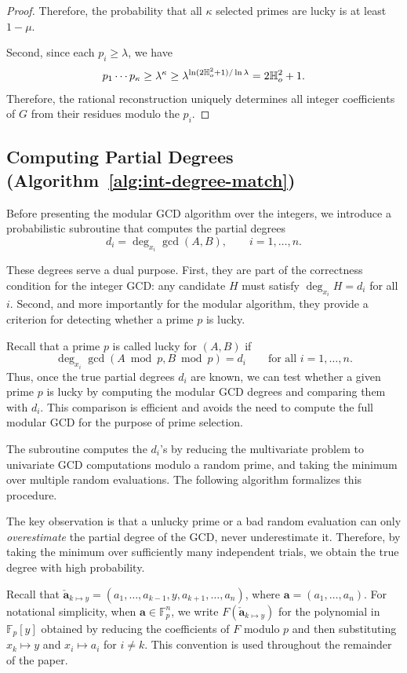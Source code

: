 \documentclass{article}
\numberwithin{equation}{section}
\begin{document}
\begin{proof}
Therefore, the probability that all $\kappa$ selected primes are lucky is at least $1 - \mu$.


Second, since each $p_i \ge \lambda$, we have
\[
p_1 \cdots p_\kappa \ge \lambda^\kappa \ge \lambda^{\ln(2\mathbb{H}_{o}^2+1)/\ln \lambda} = 2\mathbb{H}_{o}^2+1.
\]
Therefore, the rational reconstruction uniquely determines all integer coefficients of $G$ from their residues modulo the $p_i$.
\end{proof}

\subsection{Computing Partial Degrees (Algorithm~\ref{alg:int-degree-match})}
\label{sec:partial-deg}

Before presenting the modular GCD algorithm over the integers, we introduce a probabilistic subroutine that computes the partial degrees
\[
d_i = \deg_{x_i} \gcd(A,B), \qquad i = 1,\dots,n.
\]

These degrees serve a dual purpose. First, they are part of the correctness condition for the integer GCD: any candidate $H$ must satisfy $\deg_{x_i} H = d_i$ for all $i$. Second, and more importantly for the modular algorithm, they provide a criterion for detecting whether a prime $p$ is lucky.

Recall that a prime $p$ is called lucky for $(A,B)$ if
\[
\deg_{x_i} \gcd(A \bmod p, B \bmod p) = d_i \qquad \text{for all } i=1,\dots,n.
\]
Thus, once the true partial degrees $d_i$ are known, we can test whether a given prime $p$ is lucky by computing the modular GCD degrees and comparing them with $d_i$. This comparison is efficient and avoids the need to compute the full modular GCD for the purpose of prime selection.

The subroutine computes the $d_i$'s by reducing the multivariate problem to univariate GCD computations modulo a random prime, and taking the minimum over multiple random evaluations. The following algorithm formalizes this procedure.

The key observation is that  a unlucky prime or a bad random evaluation can only \emph{overestimate} the partial degree of the GCD, never underestimate it. Therefore, by taking the minimum over sufficiently many independent trials, we obtain the true degree with high probability.

Recall that $\mathbf{\check{a}}_{k \mapsto y}  = (a_1,\dots,a_{k-1}, y, a_{k+1},\dots,a_n)$, where $\mathbf{a} = (a_1,\dots,a_n)$. For notational simplicity, when $\mathbf{a} \in \mathbb{F}_p^n$, we write $F(\mathbf{\check{a}}_{k \mapsto y} )$ for the polynomial in $\mathbb{F}_p[y]$ obtained by reducing the coefficients of $F$ modulo $p$ and then substituting $x_k \mapsto y$ and $x_i \mapsto a_i$ for $i \ne k$. This convention is used throughout the remainder of the paper.
\end{document}
